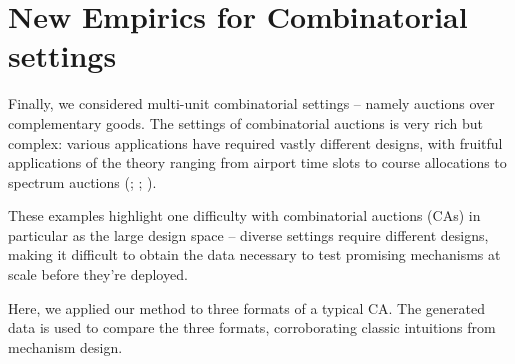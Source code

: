 \documentclass{article} %
\begin{document}


\section{New Empirics for Combinatorial settings}\label{session:combinatorial}
Finally, we considered multi-unit combinatorial settings -- namely auctions over complementary goods. 
The settings of combinatorial auctions is very rich but complex: various applications have required vastly different designs, with fruitful applications of the theory ranging from airport time slots to course allocations to spectrum auctions (\cite{rassenti1982combinatorial}; \cite{budish2011combinatorial}; \cite{milgrom2020clock}).

These examples highlight one difficulty with combinatorial auctions (CAs) in particular as the large design space -- diverse settings require different designs, making it difficult to obtain the data necessary to test promising mechanisms at scale before they're deployed.

Here, we applied our method to three formats of a typical CA. 
The generated data is used to compare the three formats, corroborating classic intuitions from mechanism design.
\end{document}
